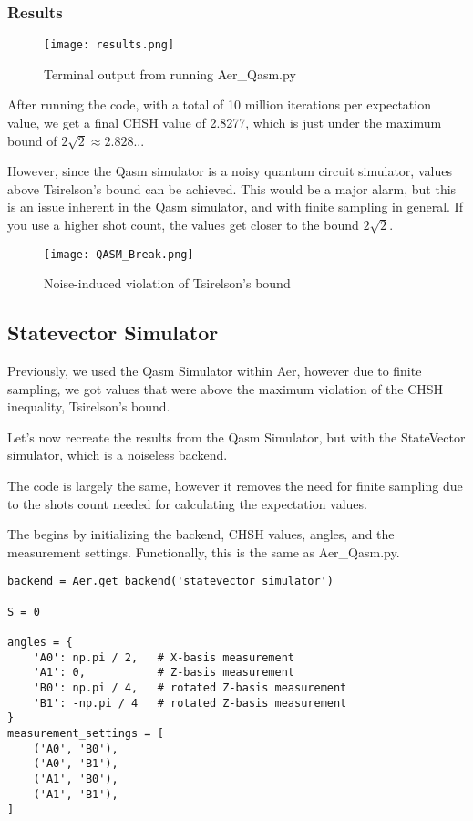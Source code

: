 \documentclass[12pt]{article}
\begin{document}
\subsubsection{Results}

\begin{figure}[h]
    \centering
    \texttt{[image: results.png]}
    \caption{Terminal output from running Aer\_Qasm.py}
    \label{fig:Qasm_results}
\end{figure}

After running the code, with a total of 10 million iterations per expectation value, we get a final CHSH value of 2.8277, which is just under the maximum bound of $2\sqrt{2} \approx 2.828...$

However, since the Qasm simulator is a noisy quantum circuit simulator, values above Tsirelson's bound can be achieved. This would be a major alarm, but this is an issue inherent in the Qasm simulator, and with finite sampling in general. If you use a higher shot count, the values get closer to the bound $2\sqrt{2}$.


\begin{figure}[h]
    \centering
    \texttt{[image: QASM\_Break.png]}
    \caption{Noise-induced violation of Tsirelson's bound}
    \label{fig:Qasm_violation_results}
\end{figure}



\subsection{Statevector Simulator}

Previously, we used the Qasm Simulator within Aer, however due to finite sampling, we got values that were above the maximum violation of the CHSH inequality, Tsirelson's bound. 

Let's now recreate the results from the Qasm Simulator, but with the StateVector simulator, which is a noiseless backend. 

The code is largely the same, however it removes the need for finite sampling due to the shots count needed for calculating the expectation values. 

The begins by initializing the backend, CHSH values, angles, and the measurement settings. Functionally, this is the same as Aer\_Qasm.py.

\begin{lstlisting}[style=python]
backend = Aer.get_backend('statevector_simulator')

S = 0

angles = {
    'A0': np.pi / 2,   # X-basis measurement
    'A1': 0,           # Z-basis measurement
    'B0': np.pi / 4,   # rotated Z-basis measurement
    'B1': -np.pi / 4   # rotated Z-basis measurement
}
measurement_settings = [
    ('A0', 'B0'), 
    ('A0', 'B1'),
    ('A1', 'B0'), 
    ('A1', 'B1'),
]
\end{lstlisting}
\end{document}
